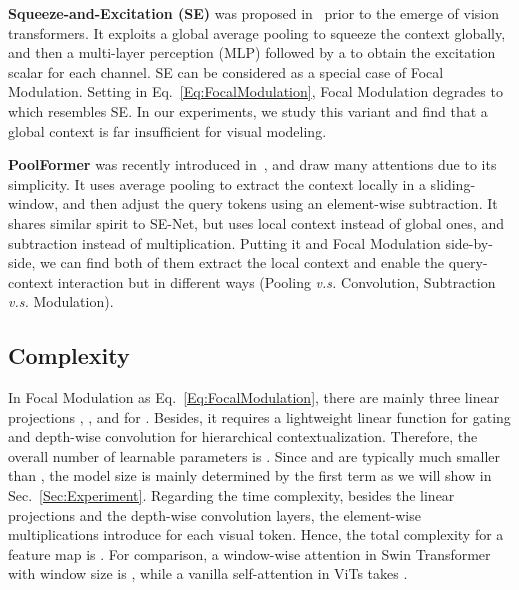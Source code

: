 \documentclass{article}
\begin{document}
\textbf{Squeeze-and-Excitation (SE)} was proposed in~\cite{hu2018squeeze} prior to the emerge of vision transformers. It exploits a global average pooling to squeeze the context globally, and then a multi-layer perception (MLP) followed by a  to obtain the excitation scalar for each channel. SE can be considered as a special case of Focal Modulation. Setting  in Eq.~\eqref{Eq:FocalModulation}, Focal Modulation degrades to  which resembles SE. In our experiments, we study this variant and find that a global context is far insufficient for visual modeling.

\textbf{PoolFormer} was recently introduced in~\cite{yu2021metaformer}, and draw many attentions due to its simplicity. It uses average pooling to extract the context locally in a sliding-window, and then adjust the query tokens using an element-wise subtraction. It shares similar spirit to SE-Net, but uses local context instead of global ones, and subtraction instead of multiplication. Putting it and Focal Modulation side-by-side, we can find both of them extract the local context and enable the query-context interaction but in different ways (Pooling \textit{v.s.} Convolution, Subtraction \textit{v.s.} Modulation). 

\subsection{Complexity} 
In Focal Modulation as Eq.~\eqref{Eq:FocalModulation}, there are mainly three linear projections , , and  for . Besides, it requires a lightweight linear function  for gating and  depth-wise convolution  for hierarchical contextualization. Therefore, the overall number of learnable parameters is . Since  and  are typically much smaller than , the model size is mainly determined by the first term as we will show in Sec.~\ref{Sec:Experiment}. Regarding the time complexity, besides the linear projections and the depth-wise convolution layers, the element-wise multiplications introduce  for each visual token. Hence, the total complexity for a feature map is . For comparison, a window-wise attention in Swin Transformer with window size  is , while a vanilla self-attention  in ViTs takes .
\end{document}
